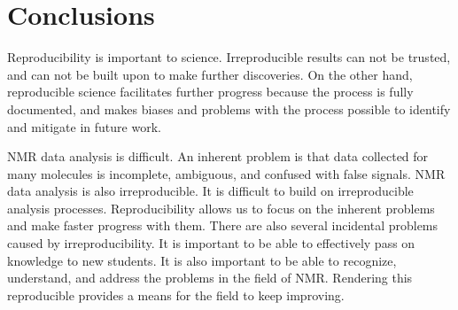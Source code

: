 \chapter{Conclusions}

Reproducibility is important to science.  Irreproducible results can not be 
trusted, and can not be built upon to make further discoveries.
On the other hand, reproducible science facilitates further progress because
the process is fully documented, and makes biases and problems with the process
possible to identify and mitigate in future work.

NMR data analysis is difficult.  An inherent problem is that data collected 
for many molecules is incomplete, ambiguous, and confused with false signals.
NMR data analysis is also irreproducible.
It is difficult to build on irreproducible analysis processes.
Reproducibility allows us to focus on the inherent problems and make faster 
progress with them.
There are also several incidental problems caused by irreproducibility.
It is important to be able to effectively pass on knowledge to new students.
It is also important to be able to recognize, understand, and address the 
problems in the field of NMR.
Rendering this reproducible provides a means for the field to keep improving.

